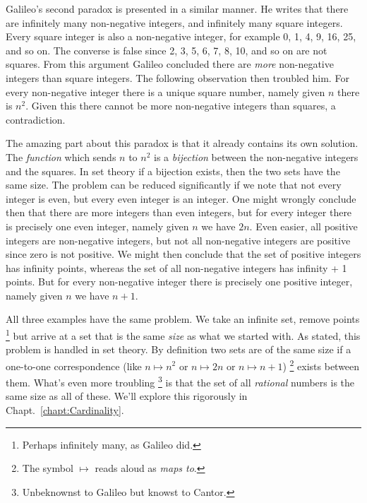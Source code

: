             \par\hfill\par
            Galileo's second paradox is presented in a similar manner. He writes
            that there are infinitely many non-negative integers, and infinitely
            many square integers. Every square integer is also a non-negative
            integer, for example 0, 1, 4, 9, 16, 25, and so on. The converse is
            false since 2, 3, 5, 6, 7, 8, 10, and so on are not squares. From
            this argument Galileo concluded there are \textit{more}
            non-negative integers than square integers. The following
            observation then troubled him. For every non-negative integer there
            is a unique square number, namely given $n$ there is $n^{2}$. Given
            this there cannot be more non-negative integers than squares, a
            contradiction.
            \par\hfill\par
            The amazing part about this paradox is that it already contains its
            own solution. The \textit{function} which sends $n$ to $n^{2}$ is a
            \textit{bijection} between the non-negative integers and the
            squares. In set theory if a bijection exists, then the two sets have
            the same size. The problem can be reduced significantly if we note
            that not every integer is even, but every even integer is an
            integer. One might wrongly conclude then that there are more
            integers than even integers, but for every integer there is
            precisely one even integer, namely given $n$ we have $2n$. Even
            easier, all positive integers are non-negative integers, but not all
            non-negative integers are positive since zero is not positive. We
            might then conclude that the set of positive integers
            has infinity points, whereas the set of all non-negative integers
            has infinity + 1 points. But for every non-negative integer there
            is precisely one positive integer, namely given $n$ we have $n+1$.
            \par\hfill\par
            All three examples have the same problem. We take an infinite set,
            remove points%
            \footnote{%
                Perhaps infinitely many, as Galileo did.
            }
            but arrive at a set that is the same \textit{size} as what we
            started with. As stated, this problem is handled in set theory. By
            definition two sets are of the same size if a one-to-one
            correspondence (like $n\mapsto{n}^{2}$ or $n\mapsto{2n}$ or
            $n\mapsto{n}+1$)%
            \footnote{%
                The symbol $\mapsto$ reads aloud as \textit{maps to}.
            }
            exists between them. What's even more troubling%
            \footnote{%
                Unbeknownst to Galileo but knowst to Cantor.
            }
            is that the set of all \textit{rational} numbers is the same size as
            all of these. We'll explore this rigorously in
            Chapt.~\ref{chapt:Cardinality}.
